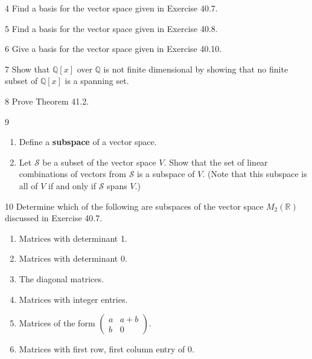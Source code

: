 \begin{problem}{4}
    Find a basis for the vector space given in Exercise 40.7.
\end{problem}
\unsolved

\begin{problem}{5}
    Find a basis for the vector space given in Exercise 40.8.
\end{problem}
\unsolved

\begin{problem}{6}
    Give a basis for the vector space given in Exercise 40.10.
\end{problem}
\unsolved

\begin{problem}{7}
    Show that $\mathbb{Q}[x]$ over $\mathbb{Q}$ is not finite dimensional by showing that no
    finite subset of $\mathbb{Q}[x]$ is a spanning set.
\end{problem}
\unsolved

\begin{problem}{8}
    Prove Theorem 41.2.
\end{problem}
\unsolved

\begin{problem}{9}
    \begin{enumerate}
        \item[(a)] Define a \textbf{subspace} of a vector space.
        \item[(b)] Let $\mathcal{S}$ be a subset of the vector space $V$. Show that the set
        of linear combinations of vectors from $\mathcal{S}$ is a subspace of $V$. (Note
        that this subspace is all of $V$ if and only if $\mathcal{S}$ spans $V$.)
    \end{enumerate}
\end{problem}
\unsolved

\begin{problem}{10}
    Determine which of the following are subspaces of the vector space $M_2(\mathbb{R})$
    discussed in Exercise 40.7.
    \begin{enumerate}
        \item[(a)] Matrices with determinant 1.
        \item[(b)] Matrices with determinant 0.
        \item[(c)] The diagonal matrices.
        \item[(d)] Matrices with integer entries.
        \item[(e)] Matrices of the form
        $\begin{pmatrix} a & a + b \\ b & 0 \end{pmatrix}$.
        \item[(f)] Matrices with first row, first column entry of 0.
    \end{enumerate}
\end{problem}
\unsolved

